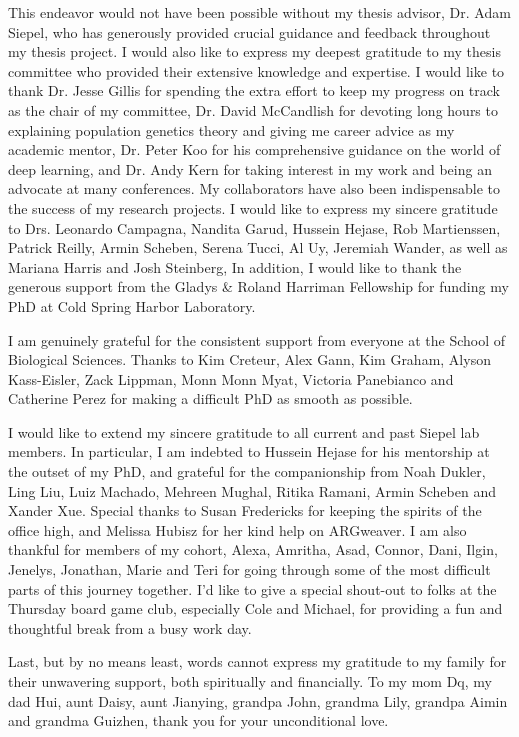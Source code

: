 
This endeavor would not have been possible without my thesis advisor, Dr. Adam Siepel, who has generously provided crucial guidance and feedback throughout my thesis project. I would also like to express my deepest gratitude to my thesis committee who provided their extensive knowledge and expertise. I would like to thank Dr. Jesse Gillis for spending the extra effort to keep my progress on track as the chair of my committee, Dr. David McCandlish for devoting long hours to explaining population genetics theory and giving me career advice as my academic mentor, Dr. Peter Koo for his comprehensive guidance on the world of deep learning, and Dr. Andy Kern for taking interest in my work and being an advocate at many conferences. My collaborators have also been indispensable to the success of my research projects. I would like to express my sincere gratitude to Drs. Leonardo Campagna, Nandita Garud, Hussein Hejase, Rob Martienssen, Patrick Reilly, Armin Scheben, Serena Tucci, Al Uy, Jeremiah Wander, as well as Mariana Harris and Josh Steinberg, In addition, I would like to thank the generous support from the Gladys \& Roland Harriman Fellowship for funding my PhD at Cold Spring Harbor Laboratory.

I am genuinely grateful for the consistent support from everyone at the School of Biological Sciences. Thanks to Kim Creteur, Alex Gann, Kim Graham, Alyson Kass-Eisler, Zack Lippman, Monn Monn Myat, Victoria Panebianco and Catherine Perez for making a difficult PhD as smooth as possible.

I would like to extend my sincere gratitude to all current and past Siepel lab members. In particular, I am indebted to Hussein Hejase for his mentorship at the outset of my PhD, and grateful for the companionship from Noah Dukler, Ling Liu, Luiz Machado, Mehreen Mughal, Ritika Ramani, Armin Scheben and Xander Xue. Special thanks to Susan Fredericks for keeping the spirits of the office high, and Melissa Hubisz for her kind help on ARGweaver. I am also thankful for members of my cohort, Alexa, Amritha, Asad, Connor, Dani, Ilgin, Jenelys, Jonathan, Marie and Teri for going through some of the most difficult parts of this journey together. I'd like to give a special shout-out to folks at the Thursday board game club, especially Cole and Michael, for providing a fun and thoughtful break from a busy work day.

Last, but by no means least, words cannot express my gratitude to my family for their unwavering support, both spiritually and financially. To my mom Dq, my dad Hui, aunt Daisy, aunt Jianying, grandpa John, grandma Lily, grandpa Aimin and grandma Guizhen, thank you for your unconditional love.
